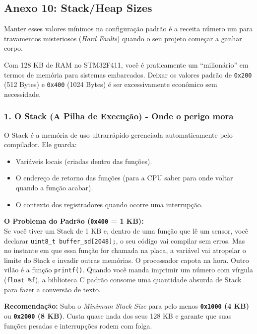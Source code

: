 \documentclass[12pt,a4paper]{article}
\begin{document}
\newpage
\subsection*{Anexo 10: Stack/Heap Sizes}
\label{anexo:10}

Manter esses valores mínimos na configuração padrão é a receita número um para travamentos misteriosos (\textit{Hard Faults}) quando o seu projeto começar a ganhar corpo.

Com 128 KB de RAM no STM32F411, você é praticamente um ``milionário'' em termos de memória para sistemas embarcados. Deixar os valores padrão de \texttt{0x200} (512 Bytes) e \texttt{0x400} (1024 Bytes) é ser excessivamente econômico sem necessidade.



\subsubsection*{1. O Stack (A Pilha de Execução) - Onde o perigo mora}
O Stack é a memória de uso ultrarrápido gerenciada automaticamente pelo compilador. Ele guarda:
\begin{itemize}
    \item Variáveis locais (criadas dentro das funções).
    \item O endereço de retorno das funções (para a CPU saber para onde voltar quando a função acabar).
    \item O contexto dos registradores quando ocorre uma interrupção.
\end{itemize}

\textbf{O Problema do Padrão (\texttt{0x400} = 1 KB):}\\
Se você tiver um Stack de 1 KB e, dentro de uma função que lê um sensor, você declarar \texttt{uint8\_t buffer\_sd[2048];}, o seu código vai compilar sem erros. Mas no instante em que essa função for chamada na placa, a variável vai atropelar o limite do Stack e invadir outras memórias. O processador capota na hora.
Outro vilão é a função \texttt{printf()}. Quando você manda imprimir um número com vírgula (\texttt{float \%f}), a biblioteca C padrão consome uma quantidade absurda de Stack para fazer a conversão de texto.

\textbf{Recomendação:} Suba o \textit{Minimum Stack Size} para pelo menos \textbf{\texttt{0x1000} (4 KB)} ou \textbf{\texttt{0x2000} (8 KB)}. Custa quase nada dos seus 128 KB e garante que suas funções pesadas e interrupções rodem com folga.
\end{document}
